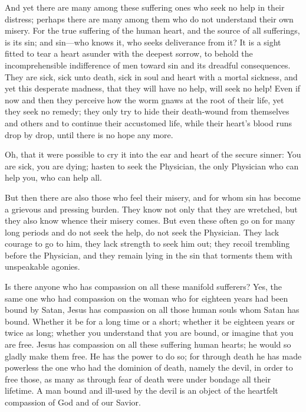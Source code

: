 And yet there are many among these suffering ones who seek no help in their distress; perhaps there are many among them who do not understand their own misery. For the true suffering of the human heart, and the source of all sufferings, is its sin; and sin—who knows it, who seeks deliverance from it? It is a sight fitted to tear a heart asunder with the deepest sorrow, to behold the incomprehensible indifference of men toward sin and its dreadful consequences. They are sick, sick unto death, sick in soul and heart with a mortal sickness, and yet this desperate madness, that they will have no help, will seek no help! Even if now and then they perceive how the worm gnaws at the root of their life, yet they seek no remedy; they only try to hide their death-wound from themselves and others and to continue their accustomed life, while their heart’s blood runs drop by drop, until there is no hope any more.

Oh, that it were possible to cry it into the ear and heart of the secure sinner: You are sick, you are dying; hasten to seek the Physician, the only Physician who can help you, who can help all.

But then there are also those who feel their misery, and for whom sin has become a grievous and pressing burden. They know not only that they are wretched, but they also know whence their misery comes. But even these often go on for many long periods and do not seek the help, do not seek the Physician. They lack courage to go to him, they lack strength to seek him out; they recoil trembling before the Physician, and they remain lying in the sin that torments them with unspeakable agonies.

Is there anyone who has compassion on all these manifold sufferers? Yes, the same one who had compassion on the woman who for eighteen years had been bound by Satan, Jesus has compassion on all those human souls whom Satan has bound. Whether it be for a long time or a short; whether it be eighteen years or twice as long; whether you understand that you are bound, or imagine that you are free. Jesus has compassion on all these suffering human hearts; he would so gladly make them free. He has the power to do so; for through death he has made powerless the one who had the dominion of death, namely the devil, in order to free those, as many as through fear of death were under bondage all their lifetime. A man bound and ill-used by the devil is an object of the heartfelt compassion of God and of our Savior.

